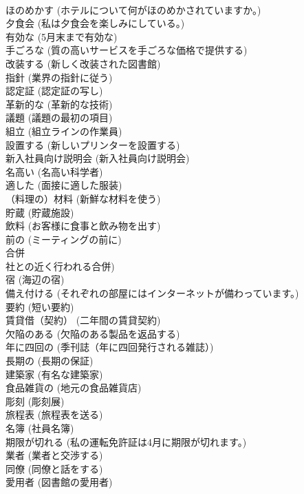 \documentclass[8pt]{extreport}
\begin{document}
\begin{CJK}{UTF8}{min}
\\	ほのめかす	(ホテルについて何がほのめかされていますか。)		
\\	夕食会	(私は夕食会を楽しみにしている。)		
\\	有効な	(5月末まで有効な)		
\\	手ごろな	(質の高いサービスを手ごろな価格で提供する)		
\\	改装する	(新しく改装された図書館)		
\\	指針	(業界の指針に従う)		
\\	認定証	(認定証の写し)		
\\	革新的な	(革新的な技術)		
\\	議題	(議題の最初の項目)		
\\	組立	(組立ラインの作業員)		
\\	設置する	(新しいプリンターを設置する)		
\\	新入社員向け説明会	(新入社員向け説明会)		
\\	名高い	(名高い科学者)		
\\	適した	(面接に適した服装)		
\\	（料理の）材料	(新鮮な材料を使う)		
\\	貯蔵	(貯蔵施設)		
\\	飲料	(お客様に食事と飲み物を出す)		
\\	前の	(ミーティングの前に)		
\\	合併	
\\	社との近く行われる合併)		
\\	宿	(海辺の宿)		
\\	備え付ける	(それぞれの部屋にはインターネットが備わっています。)		
\\	要約	(短い要約)		
\\	賃貸借（契約）	(二年間の賃貸契約)		
\\	欠陥のある	(欠陥のある製品を返品する)		
\\	年に四回の	(季刊誌（年に四回発行される雑誌）)		
\\	長期の	(長期の保証)		
\\	建築家	(有名な建築家)		
\\	食品雑貨の	(地元の食品雑貨店)		
\\	彫刻	(彫刻展)		
\\	旅程表	(旅程表を送る)		
\\	名簿	(社員名簿)		
\\	期限が切れる	(私の運転免許証は4月に期限が切れます。)		
\\	業者	(業者と交渉する)		
\\	同僚	(同僚と話をする)		
\\	愛用者	(図書館の愛用者)		

\end{CJK}
\end{document}
